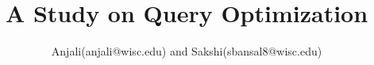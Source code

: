 \documentclass[sigplan,10pt,nonacm]{acmart}
\begin{document}


\title{\textsf{A Study on Query Optimization}}


\author{Anjali(anjali@wisc.edu) and Sakshi(sbansal8@wisc.edu)}




\maketitle












{


}
\end{document}
